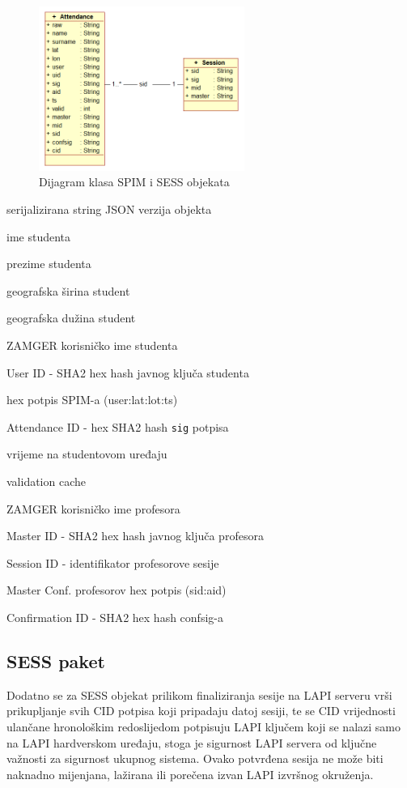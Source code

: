 \begin{figure}[H]
    \centering
    \includegraphics[width=0.6\textwidth]{material/classmodel}
    \caption{Dijagram klasa SPIM i SESS objekata}
\end{figure}
\begin{description}[align=right,labelwidth=2cm,noitemsep]
    \item [raw] serijalizirana string JSON verzija objekta
    \item [name] ime studenta
    \item [surname] prezime studenta
    \item [lat] geografska širina student
    \item [lon] geografska dužina student
    \item [user] ZAMGER korisničko ime studenta
    \item [uid] User ID - SHA2 hex hash javnog ključa studenta
    \item [sig] hex potpis SPIM-a (user:lat:lot:ts)
    \item [aid] Attendance ID - hex SHA2 hash \texttt{sig} potpisa
    \item [ts] vrijeme na studentovom uređaju
    \item [valid] validation cache
    \item [master] ZAMGER korisničko ime profesora
    \item [mid] Master ID - SHA2 hex hash javnog ključa profesora
    \item [sid] Session ID - identifikator profesorove sesije
    \item [confsig] Master Conf. profesorov hex potpis (sid:aid)
    \item [cid] Confirmation ID - SHA2 hex hash confsig-a
\end{description}

\subsection{SESS paket}
Dodatno se za SESS objekat prilikom finaliziranja sesije na LAPI serveru vrši prikupljanje svih CID potpisa koji pripadaju datoj sesiji, te se CID vrijednosti ulančane hronološkim redoslijedom potpisuju LAPI ključem koji se nalazi samo na LAPI hardverskom uređaju, stoga je sigurnost LAPI servera od ključne važnosti za sigurnost ukupnog sistema. Ovako potvrđena sesija ne može biti naknadno mijenjana, lažirana ili porečena izvan LAPI izvršnog okruženja.